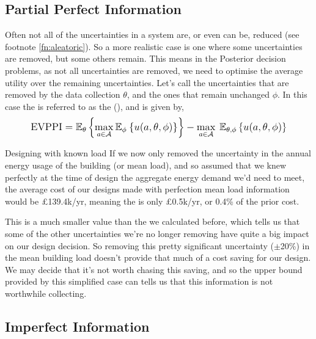 \subsection{Partial Perfect Information}

Often not all of the uncertainties in a system are, or even can be, reduced (see footnote \ref{fn:aleatoric}). So a more realistic case is one where some uncertainties are removed, but some others remain. This means in the Posterior decision problems, as not all uncertainties are removed, we need to optimise the average utility over the remaining uncertainties. Let's call the uncertainties that are removed by the data collection $\theta$, and the ones that remain unchanged $\phi$. In this case the  is referred to as the  (), and is given by,
\begin{equation} \label{eq:evppi}
    \mathlarger{
        \text{EVPPI} =
        \mathbb{E}_{\theta} \left\lbrace \max_{a \in \mathcal{A}} \mathbb{E}_{\phi} \: \lbrace u(a,\theta,\phi) \rbrace \right\rbrace
        - \max_{a \in \mathcal{A}} \: \mathbb{E}_{\theta,\phi} \left\lbrace u(a,\theta,\phi) \right\rbrace
    }
\end{equation}
\vspace{-0.4cm}

\begin{ebox}[label=ebox:evppi]{Designing with known load}
    If we now only removed the uncertainty in the annual energy usage of the building (or mean load), and so assumed that we knew perfectly at the time of design the aggregate energy demand we'd need to meet, the average cost of our designs made with perfection mean load information would be £139.4k/yr, meaning the  is only £0.5k/yr, or 0.4\% of the prior cost.

    This is a much smaller value than the  we calculated before, which tells us that some of the other uncertainties we're no longer removing have quite a big impact on our design decision. So removing this pretty significant uncertainty ($\pm$20\%) in the mean building load doesn't provide that much of a cost saving for our design. We may decide that it's not worth chasing this saving, and so the upper bound provided by this simplified case can tells us that this information is not worthwhile collecting.
\end{ebox}


\subsection{Imperfect Information}

